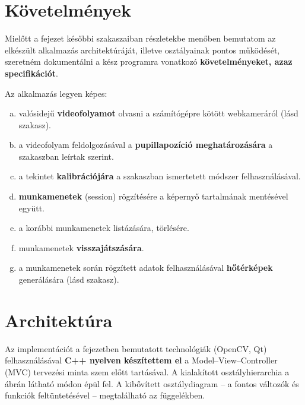\section{Követelmények}\label{sect:kovetelmenyek}

Mielőtt a fejezet későbbi szakaszaiban részletekbe menőben bemutatom az elkészült alkalmazás architektúráját, illetve osztályainak pontos működését, szeretném dokumentálni a kész programra vonatkozó \textbf{követelményeket, azaz specifikációt}.

\bigskip

Az alkalmazás legyen képes:

\begin{enumerate}[a)]
  \item valósidejű \textbf{videofolyamot} olvasni a számítógépre kötött webkameráról (lásd  szakasz).
  \item a videofolyam feldolgozásával a \textbf{pupillapozíció meghatározására} a  szakaszban leírtak szerint.
  \item a tekintet \textbf{kalibrációjára} a  szakaszban ismertetett módszer felhasználásával.
  \item \textbf{munkamenetek} (session) rögzítésére a képernyő tartalmának mentésével együtt.
  \item a korábbi munkamenetek listázására, törlésére.
  \item munkamenetek \textbf{visszajátszására}.
  \item a munkamenetek során rögzített adatok felhasználásával \textbf{hőtérképek} generálására (lásd  szakasz).
\end{enumerate}

\section{Architektúra}\label{sect:architektura}
  
  Az implementációt a  fejezetben bemutatott technológiák (OpenCV, Qt) felhasználásával \textbf{C++ nyelven készítettem el} a Model--View--Controller (MVC) tervezési minta szem előtt tartásával. A kialakított osztályhierarchia a  ábrán látható módon épül fel. A kibővített osztálydiagram  -- a fontos változók és funkciók feltüntetésével -- megtalálható az  függelékben.
  
